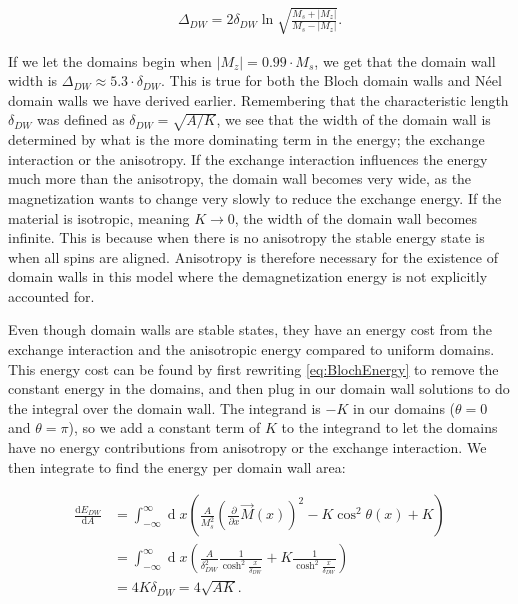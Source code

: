 \documentclass[1p]{elsarticle}		%
\renewcommand{\d}[1]{\ensuremath{\operatorname{d}\!{#1}}}
\numberwithin{equation}{section}
\begin{document}
\begin{align}
\Delta_{DW} = 2\delta_{DW}\ln\sqrt{\frac{M_s+|M_z|}{M_s-|M_z|}}.
\end{align}

If we let the domains begin when $|M_z| = 0.99\cdot M_s$, we get that the domain wall width is $\Delta_{DW} \approx 5.3 \cdot \delta_{DW}$. This is true for both the Bloch domain walls and N\'{e}el domain walls we have derived earlier. Remembering that the characteristic length $\delta_{DW}$ was defined as $\delta_{DW} = \sqrt{A/K}$, we see that the width of the domain wall is determined by what is the more dominating term in the energy; the exchange interaction or the anisotropy. If the exchange interaction influences the energy much more than the anisotropy, the domain wall becomes very wide, as the magnetization wants to change very slowly to reduce the exchange energy. If the material is isotropic, meaning $K\rightarrow0$, the width of the domain wall becomes infinite. This is because when there is no anisotropy the stable energy state is when all spins are aligned. Anisotropy is therefore necessary for the existence of domain walls in this model where the demagnetization energy is not explicitly accounted for.

Even though domain walls are stable states, they have an energy cost from the exchange interaction and the anisotropic energy compared to uniform domains. This energy cost can be found by first rewriting \eqref{eq:BlochEnergy} to remove the constant energy in the domains, and then plug in our domain wall solutions to do the integral over the domain wall. The integrand is $-K$ in our domains ($\theta = 0$ and $\theta = \pi$), so we add a constant term of $K$ to the integrand to let the domains have no energy contributions from anisotropy or the exchange interaction. We then integrate to find the energy per domain wall area:

\begin{align*}
\frac{\textrm{d} E_{DW}}{\textrm{d} A} &= \int_{-\infty}^{\infty} \d x (\frac{A}{M_s^2}(\frac{\partial}{\partial x}\vec{M}(x))^2 - K \cos ^2 \theta (x) + K) \\
&= \int_{-\infty}^{\infty} \d x (\frac{A}{\delta_{DW}^2}\frac{1}{\cosh^2\frac{x}{\delta_{DW}}} + K \frac{1}{\cosh^2\frac{x}{\delta_{DW}}}) \\
&= 4K\delta_{DW} = 4\sqrt{AK}.
\end{align*}
\end{document}
